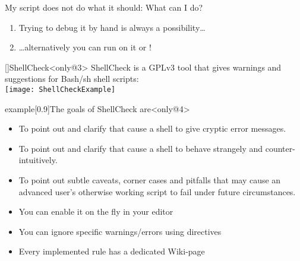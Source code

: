 \begin{frame}{My script does not do what it should: What can I do?}
    \begin{overlayarea}{\textwidth}{0.7\textheight}
        \begin{enumerate}
            \item Trying to debug it by hand is always a possibility\ldots {}
            \item<2-> \ldots{}alternatively you can run  on it or !
        \end{enumerate}
        \begin{varblock}{}[\textwidth]{ShellCheck}<only@3>
            ShellCheck is a GPLv3 tool that gives warnings and suggestions for Bash/sh shell scripts:\\[0.3em]
            \texttt{[image: ShellCheckExample]}
        \end{varblock}
        \begin{varblock*}{example}[0.9\textwidth]{The goals of ShellCheck are}<only@4>
            \begin{itemize}
                \item To point out and clarify  that cause a shell to give cryptic error messages.
                \item To point out and clarify  that cause a shell to behave strangely and counter-intuitively.
                \item To point out \alert{subtle caveats, corner cases and pitfalls} that may cause an advanced user's otherwise working script to fail under future circumstances.
            \end{itemize}
        \end{varblock*}
        \begin{itemize}[<only@4>]
            \item You can enable it on the fly in your editor
            \item You can ignore specific warnings/errors using directives
            \item Every implemented rule has a dedicated Wiki-page
        \end{itemize}
    \end{overlayarea}
\end{frame}
